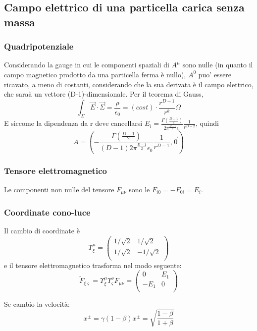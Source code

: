 \subsection{ Campo elettrico di una particella carica senza massa}
\subsubsection{Quadripotenziale}
Considerando la gauge in cui le componenti spaziali di $A^\mu$ sono nulle (in quanto il campo magnetico prodotto da una particella ferma \`e nullo), $A^0$ puo' essere ricavato, a meno di costanti, considerando che la sua derivata \`e il campo elettrico, che sara\`a un vettore (D-1)-dimensionale. Per il teorema di Gauss,
\[ \int_\Sigma \vec{E}\cdot\vec{\Sigma} = \frac{\rho}{\epsilon_0} =  (cost) \cdot \frac{r^{D-1}}{r^k}\Omega \]
E siccome la dipendenza da r deve cancellarsi \( E_i = \frac{\Gamma(\frac{D-1}{2})}{2\pi^{\frac{D-1}{2}}\epsilon_0} \frac{1}{r^{D-2}} \), quindi
\[ A = (-\frac{\Gamma(\frac{D-1}{2})}{(D-1)2\pi^{\frac{D-1}{2}}\epsilon_0} \frac{1}{r^{D-1}},\vec{0}) \]
\subsubsection{Tensore elettromagnetico}
Le componenti non nulle del tensore $F_{\mu\nu}$ sono le $F_{i0}=-F_{0i}=E_i$.

\subsubsection{Coordinate cono-luce}
Il cambio di coordinate \`e
\[ \Upsilon_\xi^\mu = 
\begin{pmatrix}
	1/\sqrt{2} & 1/\sqrt{2}  \\
	1/\sqrt{2} & -1/\sqrt{2} \\
\end{pmatrix} 
\]
e il tensore elettromagnetico trasforma nel modo seguente:
\[ \tilde{F}_{\xi\varsigma} = \Upsilon_\xi^\mu \Upsilon_\varsigma^\nu F_{\mu\nu} = 
\begin{pmatrix}
	0    & E_1 \\
	-E_1 & 0   \\
\end{pmatrix}
\]

Se cambio la velocit\`a:
\[ x^{\pm} = \gamma(1-\beta) x^{\pm} = \sqrt{\frac{1-\beta}{1+\beta}} \]








































